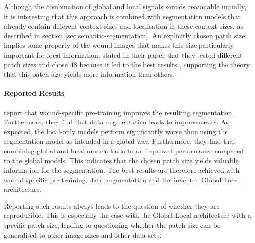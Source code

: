 Although the combination of global and local signals sounds reasonable initially, it is interesting that this approach is combined with segmentation models that already contain different context sizes and localisation in these context sizes, as described in section \ref{sec:semantic-segmentation}. An explicitly chosen patch size implies some property of the wound images that makes this size particularly important for local information. \citeauthor{Oota_2023_WACV} stated in their paper that they tested different patch sizes and chose 48 because it led to the best results \cite{Oota_2023_WACV}, supporting the theory that this patch size yields more information than others.


\paragraph{Reported Results}

\citeauthor{Oota_2023_WACV} report that wound-specific pre-training improves the resulting segmentation. Furthermore, they find that data augmentation leads to improvements. As expected, the local-only models perform significantly worse than using the segmentation model as intended in a global way. Furthermore, they find that combining global and local models leads to an improved performance compared to the global models. This indicates that the chosen patch size yields valuable information for the segmentation. The best results are therefore achieved with wound-specific pre-training, data augmentation and the invented Global-Local architecture.

Reporting such results always leads to the question of whether they are reproducible. This is especially the case with the Global-Local architecture with a specific patch size, leading to questioning whether the patch size can be generalised to other image sizes and other data sets.



